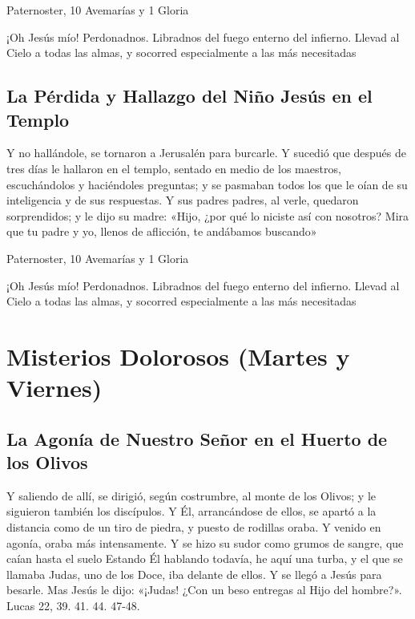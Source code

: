 \documentclass[a4paper,11pt, oneside]{report}
\begin{document}
         Paternoster, 10 Avemarías y 1 Gloria
        
        \medskip
        ¡Oh Jesús mío! Perdonadnos. Libradnos del fuego enterno del infierno. Llevad al Cielo a todas las almas, y socorred especialmente a las más 
        necesitadas
              
      \subsection*{La Pérdida y Hallazgo del Niño Jesús en el Templo}
        Y no hallándole, se tornaron a Jerusalén para burcarle. Y sucedió que después de tres días le hallaron en el templo, sentado en medio de los maestros,
        escuchándolos y haciéndoles preguntas; y se pasmaban todos los que le oían de su inteligencia y de sus respuestas. Y sus padres padres, al verle, quedaron
        sorprendidos; y le dijo su madre: «Hijo, ¿por qué lo niciste así con nosotros? Mira que tu padre y yo, llenos de aflicción, te andábamos buscando»
        
         Paternoster, 10 Avemarías y 1 Gloria
        
        \medskip
        ¡Oh Jesús mío! Perdonadnos. Libradnos del fuego enterno del infierno. Llevad al Cielo a todas las almas, y socorred especialmente a las más 
        necesitadas

    \section*{Misterios Dolorosos (Martes y Viernes)}
      
      \subsection*{La Agonía de Nuestro Señor en el Huerto de los Olivos}
        Y saliendo de allí, se dirigió, según costrumbre, al monte de los Olivos; y le siguieron también los discípulos.
        Y Él, arrancándose de ellos, se apartó a la distancia como de un tiro de piedra, y puesto de rodillas oraba. 
        Y venido en agonía, oraba más intensamente. Y se hizo su sudor como grumos de sangre, que caían hasta el suelo
        Estando Él hablando todavía, he aquí una turba, y el que se llamaba Judas, uno de los Doce, iba delante de ellos. Y se llegó a Jesús para besarle.
        Mas Jesús le dijo: «¡Judas! ¿Con un beso entregas al Hijo del hombre?». Lucas 22, 39. 41. 44. 47-48.
\end{document}
